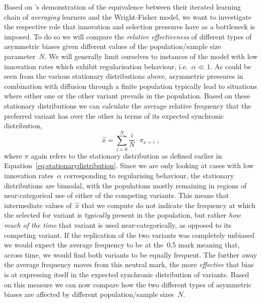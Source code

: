 Based on \citeauthor{Reali2010}'s demonstration of the equivalence between their iterated learning chain of \emph{averaging} learners and the Wright-Fisher model, we want to investigate the respective role that innovation and selection pressures have as a bottleneck is imposed. To do so we will compare the \emph{relative effectiveness} of different types of asymmetric biases given different values of the population/sample size parameter~$N$. %
We will generally limit ourselves to instances of the model with low innovation rates which exhibit regularisation behaviour, i.e.~$\alpha\ll 1$.
As could be seen from the various stationary distributions above, asymmetric pressures in combination with diffusion through a finite population typically lead to situations where either one or the other variant prevails in the population. Based on these stationary distributions we can calculate the average relative frequency that the preferred variant has over the other in terms of its expected synchronic distribution,
\begin{equation}\label{eq:averagefrequency}
\hat{x} = \sum_{i=0}^N \frac{i}{N} \cdot \pi_{x=i} \;,
\end{equation}
where $\pi$ again refers to the stationary distribution %
as defined earlier in Equation~\ref{eq:stationarydistribution}. Since we are only looking at cases with low innovation rates~$\alpha$ corresponding to regularising behaviour, the stationary distributions are bimodal, with the populations mostly remaining in regions of near-categorical use of either of the competing variants. This means that intermediate values of~$\hat{x}$ that we compute do not indicate the frequency at which the selected for variant is \emph{typically} present in the population, but rather \emph{how much of the time} that variant is used near-categorically, as opposed to its competing variant.
If the replication of the two variants was completely unbiased we would expect the average frequency to be at the~0.5 mark meaning that, across time, we would find both variants to be equally frequent. The further away the average frequency moves from this neutral mark, the more \emph{effective} that bias is at expressing itself in the expected synchronic distribution of variants.
Based on this measure we can now compare how the two different types of asymmetric biases are affected by different population/sample sizes~$N$.

